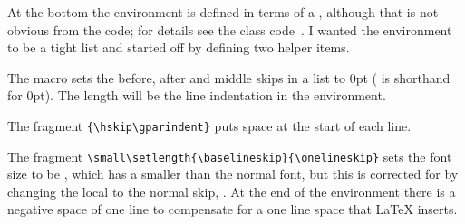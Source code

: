     At the bottom the environment is defined in terms of a , 
although that is not obvious from the code; for details see the 
class code~\cite{MEMCODE}. I wanted the environment to be a tight list 
and started off by defining two helper items.
\begin{lcode}
\newcommand*{\@zeroseps}{\setlength{\topsep}{\z@}
                         \setlength{\partopsep}{\z@}
                         \setlength{\parskip}{\z@}}
\newlength{\gparindent} \setlength{\gparindent}{0.5\parindent}
\end{lcode}
The macro \cmd{\@zeroseps} sets the before, after and middle skips in
a list to 0pt (\cmd{\z@} is shorthand for 0pt). The length \lnc{\gparindent}
will be the line indentation in the environment.
\begin{lcode}
\newenvironment{lcode}{\@zeroseps
  \renewcommand{\verbatim@startline}%
    {\verbatim@line{\hskip\gparindent}}
  \small\setlength{\baselineskip}{\onelineskip}\verbatim}%
  {\endverbatim
   \vspace{-\baselineskip}\noindent}
\end{lcode}

    The fragment \verb?{\hskip\gparindent}? puts \lnc{\gparindent} space at 
the start of each line.

    The fragment \verb?\small\setlength{\baselineskip}{\onelineskip}? sets the
font size to be \cmd{\small}, which has a smaller \lnc{\baselineskip}
than the normal font, but this is corrected for by changing the local
\lnc{\baselineskip} to the normal skip, \lnc{\onelineskip}. At the end
of the environment there is a negative space of one line to compensate
for a one line space that LaTeX inserts.

\begin{comment}
    The two versals in \Sref{sec:versal} were typeset with macros defined
in \Lpack{memsty}. The poorer of the two used the \cmd{\drop}
macro which was written for \ltx\ v2.09 by David Cantor and Dominik Wujastyk 
in 1998. The better used the \cmd{\versal} macro. Now, if you want
to try your hand at this sort of thing there are some more packages
on CTAN. I have found that the \Lpack{lettrine} package~\cite{LETTRINE} 
serves my needs.
\end{comment}


